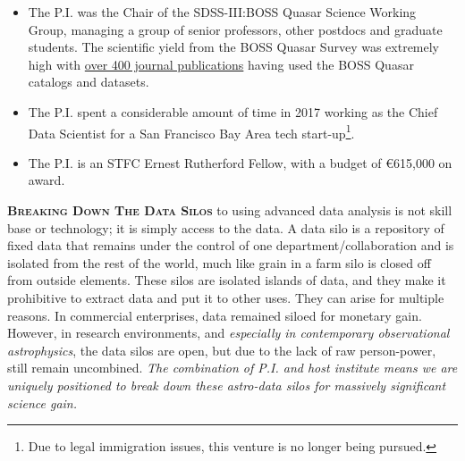 \documentclass[oneside, a4paper, onecolumn, 11pt]{article}
\begin{document}
\begin{itemize}
\item The P.I. was the Chair
of the SDSS-III:BOSS Quasar Science Working Group, managing a
group of senior professors, other postdocs and graduate students.
The scientific yield from the BOSS Quasar Survey was extremely high 
with \href{https://tinyurl.com/ycxd8lb6}{over 400 journal publications} having 
used the BOSS Quasar catalogs and datasets.

\item The P.I. spent a considerable amount of time in 2017 working as the
Chief Data Scientist for a San Francisco Bay Area 
tech start-up\footnote{Due to legal immigration issues, this venture is no longer being pursued.}. 

\item The P.I. is an STFC Ernest Rutherford Fellow, with a budget of \euro615,000 on award. 
\end{itemize}

\smallskip
\smallskip
\noindent
\textbf{\textsc{Breaking Down The Data Silos}}
to using advanced data analysis is not skill base or technology; it is
simply access to the data.  A data silo is a repository of fixed data
that remains under the control of one department/collaboration and is
isolated from the rest of the world, much like grain in a farm silo is
closed off from outside elements. These silos are isolated islands of
data, and they make it prohibitive to extract data and put it to other
uses. They can arise for multiple reasons. In commercial enterprises,
data remained siloed for monetary gain.  However, in research
environments, and {\it especially in contemporary observational
astrophysics}, the data silos are open, but due to the lack of raw
person-power, still remain uncombined. {\it The combination 
of P.I. and host institute means we are uniquely positioned to 
break down these astro-data silos for massively significant 
science gain.}
\end{document}
